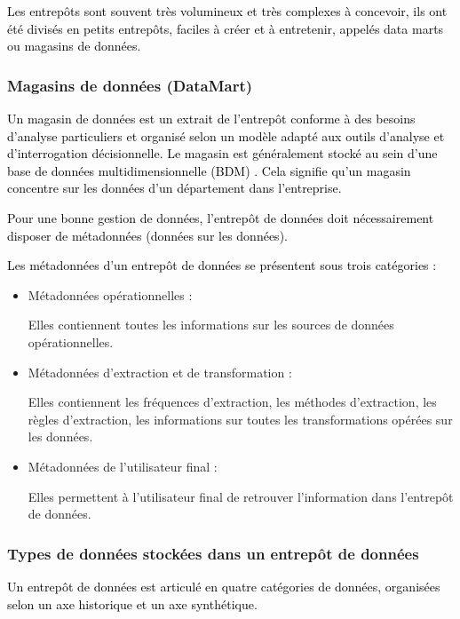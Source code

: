 \documentclass[a4paper,12pt]{report}
\begin{document}
\textcolor{black}{Les entrepôts sont souvent très volumineux et très complexes à concevoir, ils ont été divisés en petits entrepôts, faciles à créer et à entretenir, appelés  data marts  ou magasins de données.}

\subsubsection{Magasins de données (DataMart)}
\textcolor{black}{Un magasin de données est un extrait de l’entrepôt conforme à des besoins d’analyse particuliers et organisé selon un modèle adapté aux outils d’analyse et d’interrogation décisionnelle. Le magasin est généralement stocké au sein d’une base de données multidimensionnelle (BDM) \citep{tournier2007analyse}. Cela signifie qu’un magasin concentre sur les données d’un département dans l’entreprise.    }

\textcolor{black}{Pour une bonne gestion de données, l'entrepôt de données doit nécessairement disposer de métadonnées (données sur les données).}

\textcolor{black}{Les métadonnées d’un entrepôt de données se présentent sous trois catégories \citep{ponniah2001data} : 
	}


\begin{itemize}
	\item  \begin{bf}Métadonnées opérationnelles : \end{bf}Elles contiennent toutes les informations sur  les sources de données opérationnelles.
	\item  \begin{bf}Métadonnées d’extraction et de transformation :\end{bf}Elles contiennent  les fréquences d’extraction, les méthodes d’extraction, les  règles d’extraction, les  informations sur toutes les transformations opérées sur les données. 
	\item  \begin{bf}Métadonnées de l’utilisateur final : \end{bf}Elles permettent à l’utilisateur final de retrouver l’information dans l’entrepôt de données.
\end{itemize}
\subsubsection{Types de données stockées dans un entrepôt de données}
\textcolor{black}{Un entrepôt de données est articulé en quatre catégories de données, organisées selon un axe historique et un axe synthétique.  }
\end{document}
